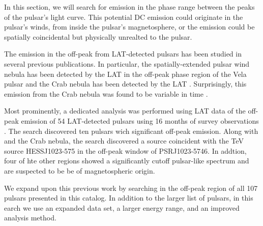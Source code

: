 
In this section, we will search for emission in the phase range between
the peaks of the pulsar's light curve. This potential DC emission could originate
in the pulsar's winds, from inside the pulsar's magnetosphere, or 
the emission could be spatially coincidental but physically
unrealted to the pulsar.

The \gev emission in the off-peak from LAT-detected pulsars has been studied in several previous 
publications. In particular, the spatially-extended \velax pulsar wind nebula has
been detected by the LAT in the off-peak phase region of the Vela pulsar \citep{LAT_collaboration_Vela_X_2010}
and the Crab nebula has been detected by the LAT \citep{LAT_collaboration_crab_2010}.
Surprisingly, this \gev emission from the Crab nebula was found to be variable
in time \citep{LAT_Collaboration_Crab_Flare_2011}.

Most prominently, a dedicated analysis was performed using LAT data of
the off-peak emission of 54 LAT-detected pulsars using 16 months of survey observations
\citep{LAT_collaboration_PWNCAT_2011}. 
The search discovered ten pulsars wich significant off-peak emission.
Along with \velax and the Crab nebula, the 
search discovered a source coincident with the TeV source HESS\;J1023-575
in the off-peak window of PSR\;J1023-5746. In addtion, four of hte other
regions showed a significantly cutoff pulsar-like spectrum and are
suspected to be be of magnetospheric origin.

We expand upon this previous work by searching in the off-peak region
of all 107 pulsars presented in this catalog. In addition to the larger
list of pulsars, in this earch we use an expanded data set, a larger energy range,
and an improved analysis method.

